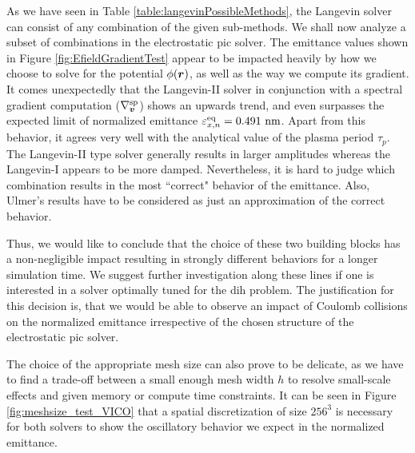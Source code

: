 As we have seen in Table \ref{table:langevinPossibleMethods}, the Langevin solver can consist of
any combination of the given sub-methods.
We shall now analyze a subset of combinations in the electrostatic \gls{pic} solver.
The emittance values shown in Figure \ref{fig:EfieldGradientTest} appear to be impacted heavily by
how we choose to solve for the potential $\phi(\boldsymbol{r})$, as well as the way we compute its gradient.
It comes unexpectedly that the Langevin-II solver in conjunction with a spectral gradient
computation ($\nabla_{\boldsymbol{v}}^{\text{sp}}$) shows an upwards trend, and even surpasses the expected
limit of normalized emittance $\varepsilon_{x,n}^{\text{eq}} = 0.491\ \text{nm}$.
Apart from this behavior, it agrees very well with the analytical value of the plasma period $\tau_p$.
The Langevin-II type solver generally results in larger amplitudes whereas the Langevin-I appears to
be more damped.
Nevertheless, it is hard to judge which combination results in the most ``correct" behavior 
of the emittance. Also, Ulmer's results have to be considered as just
an approximation of the correct behavior.

Thus, we would like to conclude that the choice of these two building blocks has a non-negligible
impact resulting in strongly different behaviors for a longer simulation time.
We suggest further investigation along these lines if one is interested in a solver optimally
tuned for the \gls{dih}
problem.
The justification for this decision is, that we would be able to observe an impact of Coulomb 
collisions on the normalized emittance irrespective of the chosen structure of the electrostatic
\gls{pic} solver.

The choice of the appropriate mesh size can also prove to be delicate, as we have to find a trade-off between a small
enough mesh width $h$ to resolve small-scale effects and given memory or compute time constraints.
It can be seen in Figure \ref{fig:meshsize_test_VICO} that a spatial discretization of size $256^3$ is
necessary for both solvers to show the oscillatory behavior we expect in the normalized emittance.

